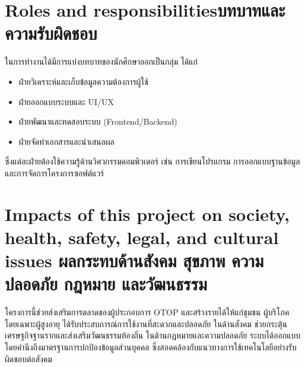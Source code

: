 \section{\ifenglish Roles and responsibilities\else บทบาทและความรับผิดชอบ\fi}
ในการทำงานได้มีการแบ่งบทบาทของนักศึกษาออกเป็นกลุ่ม ได้แก่  
\begin{itemize}
    \item ฝ่ายวิเคราะห์และเก็บข้อมูลความต้องการผู้ใช้
    \item ฝ่ายออกแบบระบบและ UI/UX
    \item ฝ่ายพัฒนาและทดสอบระบบ (Frontend/Backend)
    \item ฝ่ายจัดทำเอกสารและนำเสนอผล
\end{itemize}
ซึ่งแต่ละฝ่ายต้องใช้ความรู้ด้านวิศวกรรมคอมพิวเตอร์ 
เช่น การเขียนโปรแกรม การออกแบบฐานข้อมูล และการจัดการโครงการซอฟต์แวร์

\section{\ifenglish%
Impacts of this project on society, health, safety, legal, and cultural issues
\else%
ผลกระทบด้านสังคม สุขภาพ ความปลอดภัย กฎหมาย และวัฒนธรรม
\fi}
โครงการนี้ช่วยส่งเสริมการตลาดของผู้ประกอบการ OTOP และสร้างรายได้ให้แก่ชุมชน  
ผู้บริโภค โดยเฉพาะผู้สูงอายุ ได้รับประสบการณ์การใช้งานที่สะดวกและปลอดภัย  
ในด้านสังคม ช่วยกระตุ้นเศรษฐกิจฐานรากและส่งเสริมวัฒนธรรมท้องถิ่น  
ในด้านกฎหมายและความปลอดภัย ระบบได้ออกแบบโดยคำนึงถึงมาตรฐานการปกป้องข้อมูลส่วนบุคคล  
ซึ่งสอดคล้องกับแนวทางการใช้เทคโนโลยีอย่างรับผิดชอบต่อสังคม
